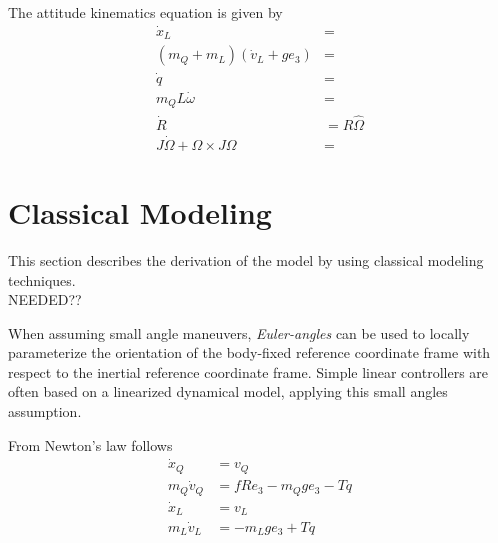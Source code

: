 The  attitude kinematics equation is given by
\begin{equation}\label{key}
\begin{aligned}
\dot{x}_L&=\\
(m_Q+m_L)(\dot{v}_L+ge_3)&=\\
\dot{q}&=\\
m_QL\dot{\omega}&=\\
\dot{R}&=R\hat{\Omega}\\
J\dot{\Omega}+\Omega\times J\Omega&=
\end{aligned}
\end{equation}


\section{Classical Modeling}\label{sec:mod.clas}

This section describes the derivation of the model by using classical modeling techniques.\\
NEEDED??



When assuming small angle maneuvers, \textit{Euler-angles} can be used to locally parameterize the orientation of the body-fixed reference coordinate frame with respect to the inertial reference coordinate frame. Simple linear controllers are often based on a linearized dynamical model, applying this small angles assumption. 

From Newton's law follows
\begin{equation}\label{eq:newton}
\begin{aligned}
\dot{x}_Q &= v_Q\\
m_Q\dot{v}_Q &=fRe_3-m_Qge_3-Tq\\
\dot{x}_L &= v_L\\
m_L\dot{v}_L &=-m_Lge_3+Tq
\end{aligned}
\end{equation}


